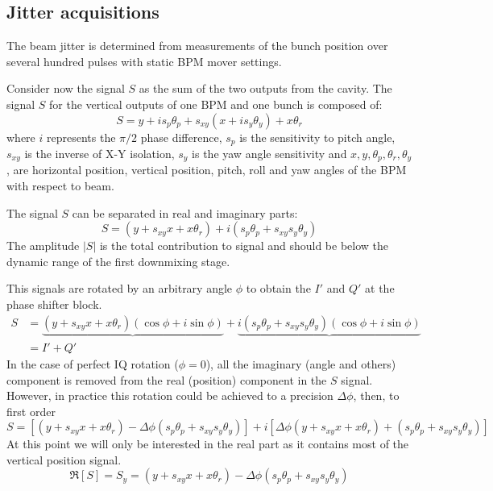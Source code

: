 \subsection{Jitter acquisitions}
The beam jitter is determined from measurements of the bunch position over several hundred pulses with static BPM mover settings.\par
Consider now the signal $S$ as the sum of the two outputs from the cavity. The signal $S$ for the vertical outputs of one BPM and one bunch is composed of:
\begin{equation}
S = y+is_p\theta_p+s_{xy}(x+is_y\theta_y)+x\theta_r
\end{equation}
where $i$ represents the $\pi/2$ phase difference, $s_p$ is the sensitivity to pitch angle, $s_{xy}$ is the inverse of X-Y isolation, $s_y$ is the yaw angle sensitivity and $x,y,\theta_p,\theta_r,\theta_y$, are horizontal position, vertical position, pitch, roll and yaw angles of the BPM with respect to beam.\par
The signal $S$ can be separated in real and imaginary parts:
\begin{equation}
S = (y+s_{xy}x+x\theta_r)+i(s_p\theta_p+s_{xy}s_y\theta_y)
\end{equation}
The amplitude $|S|$ is the total contribution to signal and should be below the dynamic range of the first downmixing stage.\par
This signals are rotated by an arbitrary angle $\phi$ to obtain the $I'$ and $Q'$ at the phase shifter block.
\begin{align*}
S &= \underbrace{(y+s_{xy}x+x\theta_r)(\cos\phi+i\sin\phi)}+\underbrace{i(s_p\theta_p+s_{xy}s_y\theta_y)(\cos\phi+i\sin\phi)}\\
  &= I' + Q' 
\end{align*}
In the case of perfect IQ rotation ($\phi=0$), all the imaginary (angle and others) component is removed from the real (position) component in the $S$ signal. However, in practice this rotation could be achieved to a precision $\Delta\phi$, then, to first order
\begin{equation}
S=[(y+s_{xy}x+x\theta_r)-\Delta\phi(s_p\theta_p+s_{xy}s_y\theta_y)]+i[\Delta\phi(y+s_{xy}x+x\theta_r)+(s_p\theta_p+s_{xy}s_y\theta_y)]
\end{equation}
At this point we will only be interested in the real part as it contains most of the vertical position signal.
\begin{equation}
 \Re[S]=S_y = (y+s_{xy}x+x\theta_r)-\Delta\phi(s_p\theta_p+s_{xy}s_y\theta_y)
\end{equation}

